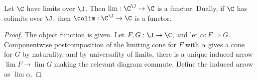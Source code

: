\begin{proposition}\label{A.2.10}
    Let $\C$ have limits over $\J$. Then $\lim : \C^\J\to\C$ is a functor. Dually, if $\C$ has colimits over $\J$, then $\colim : \C^\J\to\C$ is a functor.
\end{proposition}
\begin{proof}
    The object function is given. Let $F,G : \J\to\C$, and let $\alpha : F\Rightarrow G$. Componentwise postcomposition of the limiting cone for $F$ with $\alpha$ gives a cone for $G$ by naturality, and by universality of limits, there is a unique induced arrow $\lim F\to\lim G$ making the relevant diagram commute. Define the induced arrow as $\lim\alpha$.
\end{proof}